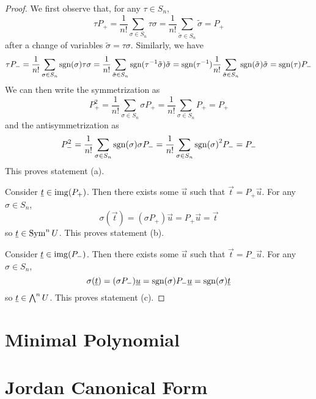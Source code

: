 \begin{proof}
    We first observe that, for any \(\tau \in S_n\),
    \begin{equation*}
        \tau P_+ = \frac{1}{n!} \sum_{\sigma \in S_n} \tau\sigma
        = \frac{1}{n!} \sum_{\tilde{\sigma} \in S_n} \tilde{\sigma}
        = P_+
    \end{equation*}
    after a change of variables \(\tilde{\sigma} = \tau\sigma\).
    Similarly, we have
    \begin{equation*}
        \tau P_- = \frac{1}{n!} \sum_{\sigma \in S_n} \operatorname{sgn}(\sigma) \tau\sigma
        = \frac{1}{n!} \sum_{\tilde{\sigma} \in S_n} \operatorname{sgn}(\tau^{-1}\tilde{\sigma}) \tilde{\sigma}
        = \operatorname{sgn}(\tau^{-1}) \frac{1}{n!} \sum_{\tilde{\sigma} \in S_n} \operatorname{sgn}(\tilde{\sigma}) \tilde{\sigma}
        = \operatorname{sgn}(\tau) P_-
    \end{equation*}
    We can then write the symmetrization as
    \begin{equation*}
        P_+^2 = \frac{1}{n!} \sum_{\sigma \in S_n} \sigma P_+
        = \frac{1}{n!} \sum_{\sigma \in S_n} P_+ = P_+
    \end{equation*}
    and the antisymmetrization as
    \begin{equation*}
        P_-^2 = \frac{1}{n!} \sum_{\sigma \in S_n} \operatorname{sgn}(\sigma) \sigma P_-
        = \frac{1}{n!} \sum_{\sigma \in S_n} {\operatorname{sgn}(\sigma)}^2 P_- = P_-
    \end{equation*}
    This proves statement (a).

    Consider \(\underline{t} \in \operatorname{img}(P_+)\).
    Then there exists some \(\vec{u}\) such that \(\vec{t} = P_+\vec{u}\).
    For any \(\sigma \in S_n\),
    \begin{equation*}
        \sigma(\vec{t}) = (\sigma P_+)\vec{u} = P_+\vec{u} = \vec{t}
    \end{equation*}
    so \(\underline{t} \in \operatorname{Sym}^n U\).
    This proves statement (b).

    Consider \(\underline{t} \in \operatorname{img}(P_-)\).
    Then there exists some \(\vec{u}\) such that \(\vec{t} = P_-\vec{u}\).
    For any \(\sigma \in S_n\),
    \begin{equation*}
        \sigma(\underline{t}) = (\sigma P_-)\underline{u} = \operatorname{sgn}(\sigma) P_-\underline{u} = \operatorname{sgn}(\sigma)\underline{t}
    \end{equation*}
    so \(\underline{t} \in \operatorname{{\bigwedge}}^n U\).
    This proves statement (c).
\end{proof}



\section{Minimal Polynomial}


\section{Jordan Canonical Form}
